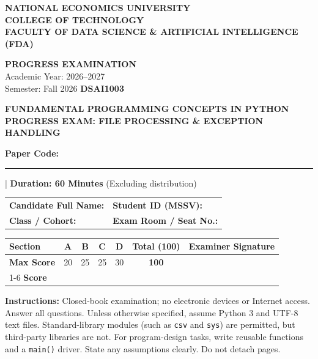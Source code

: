 \documentclass[11pt,a4paper]{article}
\begin{document}
\noindent
\begin{minipage}[t]{0.63\textwidth}\raggedright\small
\textbf{NATIONAL ECONOMICS UNIVERSITY}\\
\textbf{COLLEGE OF TECHNOLOGY}\\
\textbf{FACULTY OF DATA SCIENCE \& ARTIFICIAL INTELLIGENCE (FDA)}
\end{minipage}\hfill
\begin{minipage}[t]{0.35\textwidth}\raggedleft\footnotesize
\textbf{PROGRESS EXAMINATION}\\
Academic Year: 2026--2027\\
Semester: Fall 2026 \quad \textbf{DSAI1003}
\end{minipage}
\vspace{0.1em}
\begin{center}
{\Large\bfseries\color{primaryblue} FUNDAMENTAL PROGRAMMING CONCEPTS IN PYTHON}\\[0.05em]
{\normalsize\bfseries PROGRESS EXAM: FILE PROCESSING \& EXCEPTION HANDLING}\\[0.05em]
{\normalsize\textbf{Paper Code:} \rule{1.5cm}{0.4pt} \quad | \quad \textbf{Duration: 60 Minutes} (Excluding distribution)}
\end{center}
\begin{headerbox}
\begin{tabularx}{\linewidth}{@{}X X@{}}
\textbf{Candidate Full Name:} \dotfill & \textbf{Student ID (MSSV):} \dotfill \\[0.15em]
\textbf{Class / Cohort:} \dotfill & \textbf{Exam Room / Seat No.:} \dotfill
\end{tabularx}
\vspace{1.5mm}
\centering\setlength{\tabcolsep}{4pt}\renewcommand{\arraystretch}{1.05}
\begin{tabular}{|l|c|c|c|c||c|c|}\hline
\textbf{Section} & \textbf{A} & \textbf{B} & \textbf{C} & \textbf{D} & \textbf{Total (100)} & \textbf{Examiner Signature} \\ \hline
\textbf{Max Score} & 20 & 25 & 25 & 30 & \textbf{100} & \\[0.2em] \cline{1-6}
\textbf{Score} & & & & & & \\[0.35em] \hline
\end{tabular}
\vspace{1mm}\raggedright\scriptsize
\textbf{Instructions:} Closed-book examination; no electronic devices or Internet access. Answer all questions. Unless otherwise specified, assume Python 3 and UTF-8 text files. Standard-library modules (such as \texttt{csv} and \texttt{sys}) are permitted, but third-party libraries are not. For program-design tasks, write reusable functions and a \texttt{main()} driver. State any assumptions clearly. Do not detach pages.
\end{headerbox}
\end{document}
